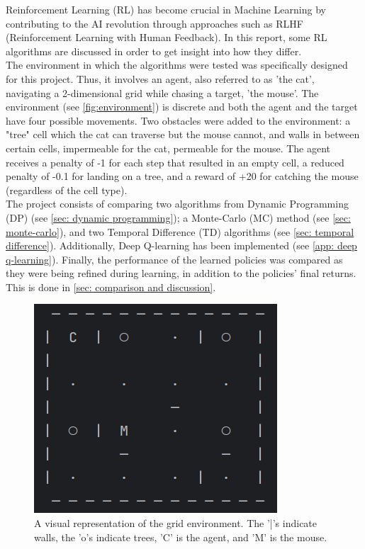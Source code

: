 \documentclass{class}
\begin{document}
Reinforcement Learning (RL) has become crucial in Machine Learning by contributing to the AI revolution through approaches such as RLHF (Reinforcement Learning with Human Feedback). In this report, some RL algorithms are discussed in order to get insight into how they differ.
\\[0.3cm]
The environment in which the algorithms were tested was specifically designed for this project. Thus, it involves an agent, also referred to as ’the cat’, navigating a 2-dimensional grid while chasing a target, ’the mouse’. The environment (see \autoref{fig:environment}) is discrete and both the agent and the target have four possible movements. Two obstacles were added to the environment: a "tree" cell which the cat can traverse but the mouse cannot, and walls in between certain cells, impermeable for the cat, permeable for the mouse. The agent receives a penalty of -1 for each step that resulted in an empty cell, a reduced penalty of -0.1 for landing on a tree, and a reward of +20 for catching the mouse (regardless of the cell type).
\\[0.3cm]
The project consists of comparing two algorithms from Dynamic Programming (DP) (see \autoref{sec: dynamic programming}); a Monte-Carlo (MC) method (see \autoref{sec: monte-carlo}), and two Temporal Difference (TD) algorithms (see \autoref{sec: temporal difference}). Additionally, Deep Q-learning has been implemented (see \autoref{app: deep q-learning}). Finally, the performance of the learned policies was compared as they were being refined during learning, in addition to the policies' final returns. This is done in \autoref{sec: comparison and discussion}.

\begin{figure}[H]
    \centering
    \includegraphics[width=0.5\linewidth]{images/environment.png}
    \caption{A visual representation of the grid environment. The '|'s indicate walls, the 'o's indicate trees, 'C' is the agent, and 'M' is the mouse.}
    \label{fig:environment}
\end{figure}
\end{document}
